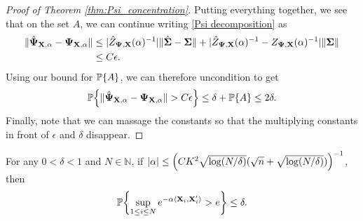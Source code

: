 \documentclass[final,12pt]{colt2018} %
\numberwithin{equation}{section}
\DeclarePairedDelimiter{\abs}{\lvert}{\rvert}
\DeclarePairedDelimiter{\norm}{\lVert}{\rVert}
\DeclarePairedDelimiter{\paren}{(}{)}
\DeclarePairedDelimiter{\braces}{\lbrace}{\rbrace}
\DeclarePairedDelimiter{\inprod}{\langle}{\rangle}
\renewcommand{\P}{\mathbb{P}}
\newcommand{\boldSigma}{\boldsymbol{\Sigma}}
\newcommand{\boldPsi}{\boldsymbol{\Psi}}
\newcommand{\boldX}{\textbf{X}}
\begin{document}
\begin{proof}[Proof of Theorem \ref{thm:Psi_concentration}]
	Putting everything together, we see that on the set $A$, we can continue writing \eqref{Psi decomposition} as
	\begin{align*}
	\norm{\hat{\boldPsi}_{\boldX,\alpha} - \boldPsi_{\boldX,\alpha}} & \leq \abs{\hat{Z}_{\boldPsi,\boldX}(\alpha)^{-1}}\norm{\hat{\boldSigma} - \boldSigma} + \abs{\hat{Z}_{\boldPsi,\boldX}(\alpha)^{-1}-Z_{\boldPsi,\boldX}(\alpha)^{-1}}\norm{\boldSigma} \\
	& \leq C\epsilon.
	\end{align*}	
	Using our bound for $\P\braces*{A}$, we can therefore uncondition to get 
	\begin{align}
	\P\braces*{\norm{\hat{\boldPsi}_{\boldX,\alpha} - \boldPsi_{\boldX,\alpha}} > C\epsilon} \leq \delta + \P\braces*{A} \leq 2\delta.
	\end{align}
	Finally, note that we can massage the constants so that the multiplying constants in front of $\epsilon$ and $\delta$ disappear.
\end{proof}

\begin{lemma} \label{uniform bound on exp factors}
	For any $0 < \delta < 1$ and $N \in \mathbb{N}$, if $\abs{\alpha} \leq \paren*{CK^2\sqrt{\log(N/\delta)}(\sqrt{n}+\sqrt{\log(N/\delta)})}^{-1}$, then
	\begin{align}
	\P\braces*{\sup_{1 \leq i \leq N}e^{-\alpha\inprod{\boldX_i,\boldX_i'}} > e} \leq \delta.
	\end{align}
\end{lemma}
\end{document}
